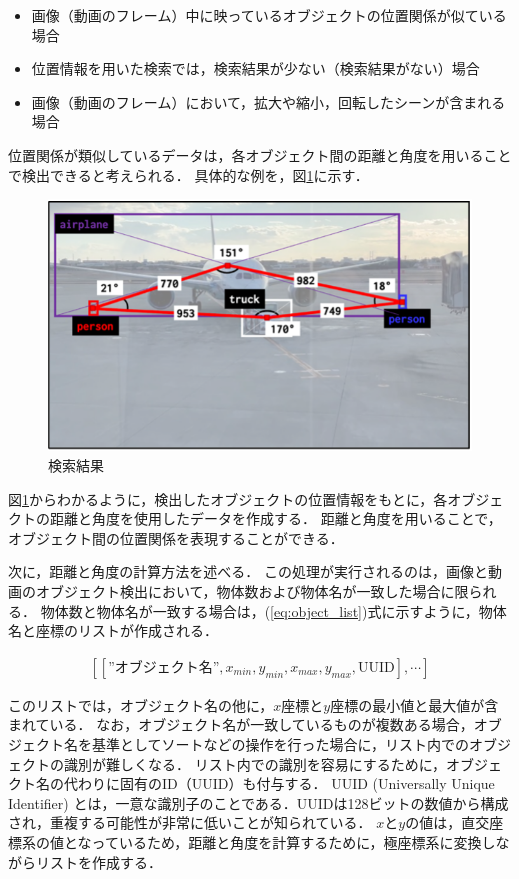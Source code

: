 \documentclass[a4j,12pt,dvipdfmx]{jreport}
\begin{document}
\begin{itemize}
  \item 画像（動画のフレーム）中に映っているオブジェクトの位置関係が似ている場合
  \item 位置情報を用いた検索では，検索結果が少ない（検索結果がない）場合
  \item 画像（動画のフレーム）において，拡大や縮小，回転したシーンが含まれる場合
\end{itemize}


位置関係が類似しているデータは，各オブジェクト間の距離と角度を用いることで検出できると考えられる．
具体的な例を，図\ref{fig:object_relationship}に示す．

\begin{figure}[t]
  \centering
  \includegraphics[width=13cm]{image/object_relationship.png}
  \caption{検索結果}
  \label{fig:object_relationship}
\end{figure}

図\ref{fig:object_relationship}からわかるように，検出したオブジェクトの位置情報をもとに，各オブジェクトの距離と角度を使用したデータを作成する．
距離と角度を用いることで，オブジェクト間の位置関係を表現することができる．

次に，距離と角度の計算方法を述べる．
この処理が実行されるのは，画像と動画のオブジェクト検出において，物体数および物体名が一致した場合に限られる．
物体数と物体名が一致する場合は，(\ref{eq:object_list})式に示すように，物体名と座標のリストが作成される．

\begin{eqnarray}
  \label{eq:object_list}
  [[\text{”オブジェクト名”},x_{min},y_{min},x_{max},y_{max},\text{UUID}],\cdots]
\end{eqnarray}

このリストでは，オブジェクト名の他に，$x$座標と$y$座標の最小値と最大値が含まれている．
なお，オブジェクト名が一致しているものが複数ある場合，オブジェクト名を基準としてソートなどの操作を行った場合に，リスト内でのオブジェクトの識別が難しくなる．
リスト内での識別を容易にするために，オブジェクト名の代わりに固有のID（UUID）も付与する．
UUID (Universally Unique Identifier) とは，一意な識別子のことである．UUIDは128ビットの数値から構成され，重複する可能性が非常に低いことが知られている．
$x$と$y$の値は，直交座標系の値となっているため，距離と角度を計算するために，極座標系に変換しながらリストを作成する．
\end{document}
